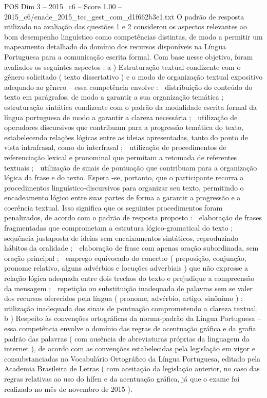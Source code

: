\begin{textsample}{POS Dim 3 – 2015\_c6 – Score 1.00 – 2015\_c6/enade\_2015\_tec\_gest\_com\_d1f662b3e1.txt}
O padrão de resposta utilizado na avaliação das questões 1 e 2 considerou os aspectos relevantes ao bom desempenho linguístico como competências distintas, de modo a permitir um mapeamento detalhado do domínio dos recursos disponíveis na Língua Portuguesa para a comunicação escrita formal.
Com base nesse objetivo, foram avaliados os seguintes aspectos : a ) Estruturação textual condizente com o gênero solicitado ( texto dissertativo ) e o modo de organização textual expositivo adequado ao gênero – essa competência envolve :  distribuição do conteúdo do texto em parágrafos, de modo a garantir a sua organização temática ;  estruturação sintática condizente com o padrão da modalidade escrita formal da língua portuguesa de modo a garantir a clareza necessária ;  utilização de operadores discursivos que contribuam para a progressão temática do texto, estabelecendo relações lógicas entre as ideias apresentadas, tanto do ponto de vista intrafrasal, como do interfrasal ;  utilização de procedimentos de referenciação lexical e pronominal que permitam a retomada de referentes textuais ;  utilização de sinais de pontuação que contribuam para a organização lógica da frase e do texto.
Espera -se, portanto, que o participante recorra a procedimentos linguístico-discursivos para organizar seu texto, permitindo o encadeamento lógico entre suas partes de forma a garantir a progressão e a coerência textual.
Isso significa que os seguintes procedimentos foram penalizados, de acordo com o padrão de resposta proposto :  elaboração de frases fragmentadas que comprometam a estrutura lógico-gramatical do texto ;  sequência justaposta de ideias sem encaixamentos sintáticos, reproduzindo hábitos da oralidade ;  elaboração de frase com apenas oração subordinada, sem oração principal ;  emprego equivocado do conector ( preposição, conjunção, pronome relativo, alguns advérbios e locuções adverbiais ) que não expresse a relação lógica adequada entre dois trechos do texto e prejudique a compreensão da mensagem ;  repetição ou substituição inadequada de palavras sem se valer dos recursos oferecidos pela língua ( pronome, advérbio, artigo, sinônimo ) ;  utilização inadequada dos sinais de pontuação comprometendo a clareza textual. b ) Respeito às convenções ortográficas da norma-padrão da Língua Portuguesa – essa competência envolve o domínio das regras de acentuação gráfica e da grafia padrão das palavras ( com ausência de abreviaturas próprias da linguagem da internet ), de acordo com as convenções estabelecidas pela legislação em vigor e consubstanciadas no Vocabulário Ortográfico da Língua Portuguesa, editado pela Academia Brasileira de Letras ( com aceitação da legislação anterior, no caso das regras relativas ao uso do hífen e da acentuação gráfica, já que o exame foi realizado no mês de novembro de 2015 ).

\end{textsample}
